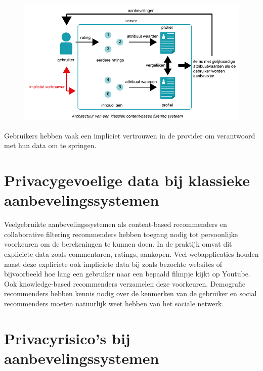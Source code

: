 \begin{figure}[htpb]   
    \label{Figuur::randomisatie}      
  \begin{center}    
 \includegraphics[scale=0.5]{fig/klassiek_systeem}    
  \end{center}   
   
   \end{figure}
Gebruikers hebben vaak een impliciet vertrouwen in de provider om verantwoord met hun data om te springen. 

\section{Privacygevoelige data bij klassieke aanbevelingssystemen}
Veelgebruikte aanbevelingssystemen als content-based recommenders en collaborative filtering recommenders hebben toegang nodig tot persoonlijke voorkeuren om de berekeningen te kunnen doen. In de praktijk omvat dit expliciete data zoals commentaren, ratings, aankopen. Veel webapplicaties houden naast deze expliciete ook impliciete data bij zoals bezochte websites of bijvoorbeeld hoe lang een gebruiker naar een bepaald filmpje kijkt op Youtube. Ook knowledge-based recommenders verzamelen deze voorkeuren. Demografic recommenders hebben kennis nodig over de kenmerken van de gebruiker en social recommenders moeten natuurlijk weet hebben van het sociale netwerk.
\section{Privacyrisico's bij aanbevelingssystemen}
\label{sec:risicos}
